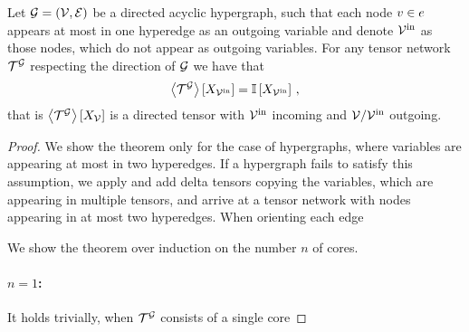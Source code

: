 \begin{theorem}\label{the:conditionalContractionPreservation}
	Let $\mathcal{G}=(\mathcal{V},\mathcal{E})$ be a directed acyclic hypergraph, such that each node $v\in e$ appears at most in one hyperedge as an outgoing variable and denote $\mathcal{V}^{\mathrm{in}}$ as those nodes, which do not appear as outgoing variables.
	For any tensor network $\mathcal{T}^{\mathcal{G}}$ respecting the direction of $\mathcal{G}$ we have that
		\[ \left\langle \mathcal{T}^{\mathcal{G}}\right\rangle \left[ X_{\mathcal{V}^{\mathrm{in}}} \right] = \mathbb{I}\left[X_{\mathcal{V}^{\mathrm{in}}}\right] \, , \]
	that is $\left\langle \mathcal{T}^{\mathcal{G}}\right\rangle \left[ X_{\mathcal{V}} \right]$ is a directed tensor with $\mathcal{V}^{\mathrm{in}}$ incoming and $\mathcal{V}/\mathcal{V}^{\mathrm{in}}$ outgoing.
\end{theorem}
\begin{proof}
	We show the theorem only for the case of hypergraphs, where variables are appearing at most in two hyperedges.
	If a hypergraph fails to satisfy this assumption, we apply  and add delta tensors copying the variables, which are appearing in multiple tensors, and arrive at a tensor network with nodes appearing in at most two hyperedges.
	When orienting each edge 
	
	We show the theorem over induction on the number $n$ of cores.
	\paragraph{$n=1$:} It holds trivially, when $\mathcal{T}^{\mathcal{G}}$ consists of a single core

\end{proof}
